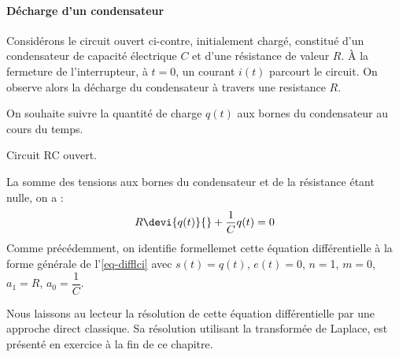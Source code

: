 \paragraph{Décharge d'un condensateur\label{para-decharge}}
Considérons le circuit ouvert ci-contre, initialement chargé, constitué 
d'un condensateur de capacité électrique $C$ et d'une résistance de valeur $R$. 
À la fermeture de l'interrupteur, à $t=0$, un courant $i(t)$ parcourt 
le circuit. On observe alors la décharge du condensateur à travers 
une resistance $R$. 

On souhaite suivre la quantité de charge $q(t)$ aux bornes du condensateur au 
cours du temps.
\begin{marginfigure}[-8em]   
    \centering
    
    \caption{Circuit RC ouvert.\label{fig-decharge_condensateur}}
\end{marginfigure}
La somme des tensions aux bornes du condensateur et de la résistance 
étant nulle, on a :
\begin{align*}
    R\devi{q(t)}{}+\dfrac{1}{C}q(t)=0 
\end{align*}
Comme précédemment, on identifie formellemet cette équation différentielle 
à la forme générale de l'\cref{eq-difflci} avec $s(t)=q(t)$, $e(t)=0$, 
$n=$1, $m=0$, $a_1=R$, $a_0=\dfrac{1}{C}$.

Nous laissons au lecteur la résolution de cette équation différentielle 
par une approche direct classique. Sa résolution utilisant la transformée 
de Laplace, est présenté en exercice à la fin de ce chapitre.
